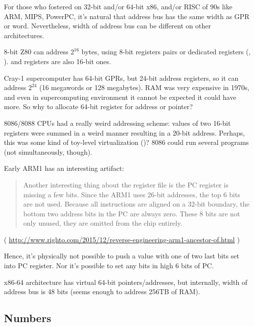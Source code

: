 For those who fostered on 32-bit and/or 64-bit x86, and/or RISC of 90s like ARM, MIPS, PowerPC, it's natural that
address bus has the same width as \ac{GPR} or \gls{word}.
Nevertheless, width of address bus can be different on other architectures.

8-bit Z80 can address $2^{16}$ bytes, using 8-bit registers pairs or dedicated registers (, ).
 and  registers are also 16-bit ones.

Cray-1 supercomputer has 64-bit GPRs, but 24-bit address registers, so it can address $2^{24}$ 
(16 megawords or 128 megabytes).
RAM was very expensive in 1970s, and even in supercomputing environment it cannot be expected it could have more.
So why to allocate 64-bit register for address or pointer?

8086/8088 CPUs had a really weird addressing scheme:
values of two 16-bit registers were summed in a weird manner resulting in a 20-bit address.
Perhaps, this was some kind of toy-level virtualization ()?
8086 could run several programs (not simultaneously, though).

Early ARM1 has an interesting artifact:

\begin{framed}
\begin{quotation}
Another interesting thing about the register file is the PC register is missing a few bits. Since the ARM1 uses 26-bit addresses, the top 6 bits are not used. Because all instructions are aligned on a 32-bit boundary, the bottom two address bits in the PC are always zero. These 8 bits are not only unused, they are omitted from the chip entirely.
\end{quotation}
\end{framed}

( \url{http://www.righto.com/2015/12/reverse-engineering-arm1-ancestor-of.html} )

Hence, it's physically not possible to push a value with one of two last bits set into PC register.
Nor it's possible to set any bits in high 6 bits of PC.

x86-64 architecture has virtual 64-bit pointers/addresses, but internally, width of address bus is 48 bits
(seems enough to address 256TB of \ac{RAM}).

\subsection{Numbers}

